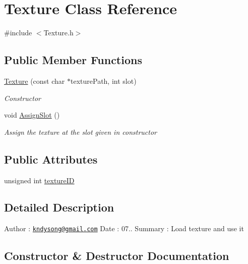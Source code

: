 \hypertarget{class_texture}{}\section{Texture Class Reference}
\label{class_texture}


{\ttfamily \#include $<$Texture.\+h$>$}

\subsection*{Public Member Functions}
\begin{DoxyCompactItemize}
\item 
\mbox{\hyperlink{class_texture_a326aff52d651ba1711155f2f821379a2}{Texture}} (const char $\ast$texture\+Path, int slot)
\begin{DoxyCompactList}\small\item\em Constructor \end{DoxyCompactList}\item 
void \mbox{\hyperlink{class_texture_a67785884b84d16cd6a35f6d664644747}{Assign\+Slot}} ()
\begin{DoxyCompactList}\small\item\em Assign the texture at the slot given in constructor \end{DoxyCompactList}\end{DoxyCompactItemize}
\subsection*{Public Attributes}
\begin{DoxyCompactItemize}
\item 
unsigned int \mbox{\hyperlink{class_texture_a91e56244efb8d5d29a52cb76264539a8}{texture\+ID}}
\end{DoxyCompactItemize}


\subsection{Detailed Description}
Author \+: \href{mailto:kndysong@gmail.com}{\tt kndysong@gmail.\+com} Date \+: 07.. Summary \+: Load texture and use it 

\subsection{Constructor \& Destructor Documentation}
\mbox{\label{class_texture_a326aff52d651ba1711155f2f821379a2}} 
